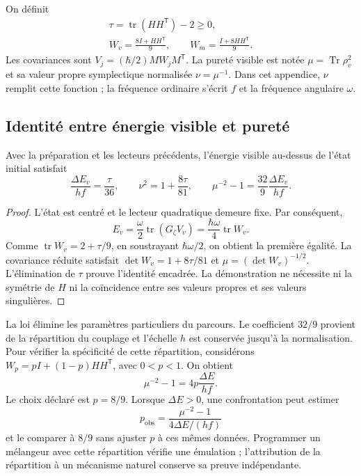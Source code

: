 On définit
\begin{equation}
 \begin{gathered}
 \tau=\operatorname{tr}(HH^{\mathsf T})-2\geq0,\\
 W_v=\frac{8I+HH^{\mathsf T}}9,\qquad
 W_m=\frac{I+8HH^{\mathsf T}}9.
 \end{gathered}
 \label{md:aux:covarianzas-reducidas}
\end{equation}
Les covariances sont $V_j=(\hbar/2)MW_jM^{\mathsf T}$.
La pureté visible est notée $\mu=\operatorname{Tr}\rho_v^2$
et sa valeur propre symplectique normalisée $\nu=\mu^{-1}$.
Dans cet appendice, $\nu$ remplit cette fonction ; la fréquence
ordinaire s’écrit $f$ et la fréquence angulaire $\omega$.

\subsection{Identité entre énergie visible et pureté}
\label{md:aux:energia-pureza}

\begin{proposition}
\label{md:aux:prop-energia-pureza}
Avec la préparation et les lecteurs précédents, l’énergie
visible au-dessus de l’état initial satisfait
\begin{equation}
 \frac{\Delta E_v}{hf}=\frac\tau{36},\qquad
 \nu^2=1+\frac{8\tau}{81},\qquad
 \boxed{\mu^{-2}-1=\frac{32}{9}\frac{\Delta E_v}{hf}.}
 \label{md:aux:identidad-energia-pureza}
\end{equation}
\end{proposition}
\begin{proof}
L’état est centré et le lecteur quadratique demeure fixe.
Par conséquent,
\[
 E_v=\frac\omega2\operatorname{tr}(G_\zeta V_v)
 =\frac{\hbar\omega}{4}\operatorname{tr}W_v.
\]
Comme $\operatorname{tr}W_v=2+\tau/9$, en soustrayant
$\hbar\omega/2$, on obtient la première égalité.
La covariance réduite satisfait
$\det W_v=1+8\tau/81$ et $\mu=(\det W_v)^{-1/2}$.
L’élimination de $\tau$ prouve l’identité encadrée.
La démonstration ne nécessite ni la symétrie de $H$ ni la coïncidence
entre ses valeurs propres et ses valeurs singulières.
\end{proof}

La loi élimine les paramètres particuliers du parcours.
Le coefficient $32/9$ provient de la répartition du couplage
et l’échelle $h$ est conservée jusqu’à la normalisation.
Pour vérifier la spécificité de cette répartition, considérons
$W_p=pI+(1-p)HH^{\mathsf T}$, avec $0<p<1$. On obtient
\begin{equation}
 \mu^{-2}-1=4p\frac{\Delta E}{hf}.
 \label{md:aux:reparto-general}
\end{equation}
Le choix déclaré est $p=8/9$. Lorsque $\Delta E>0$,
une confrontation peut estimer
\begin{equation}
 p_{\mathrm{obs}}=
 \frac{\mu^{-2}-1}{4\Delta E/(hf)}
 \label{md:aux:reparto-observado}
\end{equation}
et le comparer à $8/9$ sans ajuster $p$ à ces mêmes données.
Programmer un mélangeur avec cette répartition vérifie une
émulation ; l’attribution de la répartition à un mécanisme naturel
conserve sa preuve indépendante.

